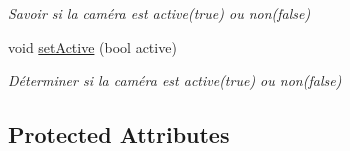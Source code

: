 \begin{DoxyCompactItemize}
\begin{DoxyCompactList}\small\item\em Savoir si la caméra est active(true) ou non(false) \end{DoxyCompactList}\item 
\hypertarget{classAbstractCamera_a0c7bbb7102072e5776646cb8ef04603f}{void \hyperlink{classAbstractCamera_a0c7bbb7102072e5776646cb8ef04603f}{set\-Active} (bool active)}\label{classAbstractCamera_a0c7bbb7102072e5776646cb8ef04603f}

\begin{DoxyCompactList}\small\item\em Déterminer si la caméra est active(true) ou non(false) \end{DoxyCompactList}\end{DoxyCompactItemize}
\subsection*{Protected Attributes}
